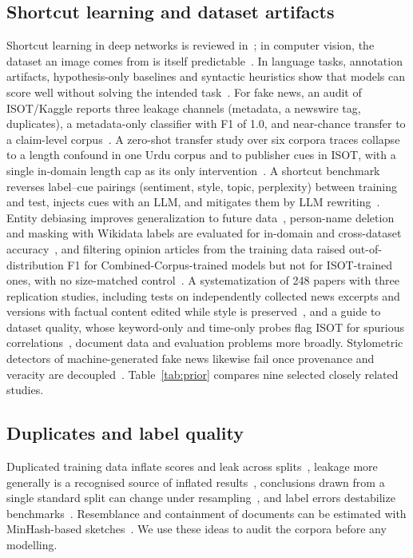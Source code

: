 \subsection{Shortcut learning and dataset artifacts}
Shortcut learning in deep networks is reviewed in~\cite{geirhos2020shortcut}; in computer vision, the dataset an image comes from is itself predictable~\cite{torralba2011unbiased}. In language tasks, annotation artifacts, hypothesis-only baselines and syntactic heuristics show that models can score well without solving the intended task~\cite{gururangan2018annotation,niven2019probing,poliak2018hypothesis,mccoy2019right}. For fake news, an audit of ISOT/Kaggle reports three leakage channels (metadata, a newswire tag, duplicates), a metadata-only classifier with F1 of 1.0, and near-chance transfer to a claim-level corpus~\cite{verma2026accuracy}. A zero-shot transfer study over six corpora traces collapse to a length confound in one Urdu corpus and to publisher cues in ISOT, with a single in-domain length cap as its only intervention~\cite{haroon2026benchmarks}. A shortcut benchmark reverses label--cue pairings (sentiment, style, topic, perplexity) between training and test, injects cues with an LLM, and mitigates them by LLM rewriting~\cite{wan2025truth}. Entity debiasing improves generalization to future data~\cite{zhu2022endef}, person-name deletion and masking with Wikidata labels are evaluated for in-domain and cross-dataset accuracy~\cite{murayama2021diachronic}, and filtering opinion articles from the training data raised out-of-distribution F1 for Combined-Corpus-trained models but not for ISOT-trained ones, with no size-matched control~\cite{blackledge2021transforming}. A systematization of 248 papers with three replication studies, including tests on independently collected news excerpts and versions with factual content edited while style is preserved~\cite{xiao2023sok}, and a guide to dataset quality, whose keyword-only and time-only probes flag ISOT for spurious correlations~\cite{thibault2024guide}, document data and evaluation problems more broadly.
Stylometric detectors of machine-generated fake news likewise fail once provenance and veracity are decoupled~\cite{schuster2020limitations}. Table~\ref{tab:prior} compares nine selected closely related studies.

\subsection{Duplicates and label quality}
Duplicated training data inflate scores and leak across splits~\cite{lee2022dedup}, leakage more generally is a recognised source of inflated results~\cite{kaufman2012leakage,kapoor2023leakage}, conclusions drawn from a single standard split can change under resampling~\cite{gorman2019standard}, and label errors destabilize benchmarks~\cite{northcutt2021labelerrors}. Resemblance and containment of documents can be estimated with MinHash-based sketches~\cite{broder1997resemblance}. We use these ideas to audit the corpora before any modelling.

